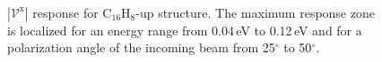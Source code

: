 \documentclass[prb,11pt,tightenlines,twocolumn,aps]{revtex4-1}
\begin{document}
\begin{figure}[tb]
    \centering
    \\
    \caption{$|\mathcal{V}^{\mathrm{x}}|$ response for C$_{16}$H$_{8}$-up
    structure. The maximum response zone is localized for an energy range from
    0.04\,eV to 0.12\,eV and for a polarization angle of the
    incoming beam from 25$^{\circ}$ to 50$^{\circ}$.}
    \label{fig:up-vab-mag-1}
\end{figure}
\end{document}
